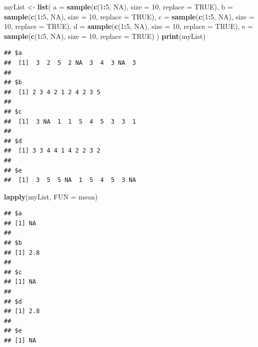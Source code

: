 \documentclass[
]{book}
\newenvironment{Shaded}{\begin{snugshade}}{\end{snugshade}}
\newcommand{\DataTypeTok}[1]{\textcolor[rgb]{0.13,0.29,0.53}{#1}}
\newcommand{\DecValTok}[1]{\textcolor[rgb]{0.00,0.00,0.81}{#1}}
\newcommand{\KeywordTok}[1]{\textcolor[rgb]{0.13,0.29,0.53}{\textbf{#1}}}
\newcommand{\NormalTok}[1]{#1}
\newcommand{\OperatorTok}[1]{\textcolor[rgb]{0.81,0.36,0.00}{\textbf{#1}}}
\newcommand{\OtherTok}[1]{\textcolor[rgb]{0.56,0.35,0.01}{#1}}
\newcommand{\StringTok}[1]{\textcolor[rgb]{0.31,0.60,0.02}{#1}}
\begin{document}
\begin{Shaded}
\begin{Highlighting}[]
\NormalTok{myList <-}\StringTok{ }\KeywordTok{list}\NormalTok{(}
  \DataTypeTok{a =} \KeywordTok{sample}\NormalTok{(}\KeywordTok{c}\NormalTok{(}\DecValTok{1}\OperatorTok{:}\DecValTok{5}\NormalTok{, }\OtherTok{NA}\NormalTok{), }\DataTypeTok{size =} \DecValTok{10}\NormalTok{, }\DataTypeTok{replace =} \OtherTok{TRUE}\NormalTok{), }
  \DataTypeTok{b =} \KeywordTok{sample}\NormalTok{(}\KeywordTok{c}\NormalTok{(}\DecValTok{1}\OperatorTok{:}\DecValTok{5}\NormalTok{, }\OtherTok{NA}\NormalTok{), }\DataTypeTok{size =} \DecValTok{10}\NormalTok{, }\DataTypeTok{replace =} \OtherTok{TRUE}\NormalTok{), }
  \DataTypeTok{c =} \KeywordTok{sample}\NormalTok{(}\KeywordTok{c}\NormalTok{(}\DecValTok{1}\OperatorTok{:}\DecValTok{5}\NormalTok{, }\OtherTok{NA}\NormalTok{), }\DataTypeTok{size =} \DecValTok{10}\NormalTok{, }\DataTypeTok{replace =} \OtherTok{TRUE}\NormalTok{), }
  \DataTypeTok{d =} \KeywordTok{sample}\NormalTok{(}\KeywordTok{c}\NormalTok{(}\DecValTok{1}\OperatorTok{:}\DecValTok{5}\NormalTok{, }\OtherTok{NA}\NormalTok{), }\DataTypeTok{size =} \DecValTok{10}\NormalTok{, }\DataTypeTok{replace =} \OtherTok{TRUE}\NormalTok{), }
  \DataTypeTok{e =} \KeywordTok{sample}\NormalTok{(}\KeywordTok{c}\NormalTok{(}\DecValTok{1}\OperatorTok{:}\DecValTok{5}\NormalTok{, }\OtherTok{NA}\NormalTok{), }\DataTypeTok{size =} \DecValTok{10}\NormalTok{, }\DataTypeTok{replace =} \OtherTok{TRUE}\NormalTok{)}
\NormalTok{)}
\KeywordTok{print}\NormalTok{(myList)}
\end{Highlighting}
\end{Shaded}

\begin{verbatim}
## $a
##  [1]  3  2  5  2 NA  3  4  3 NA  3
## 
## $b
##  [1] 2 3 4 2 1 2 4 2 3 5
## 
## $c
##  [1]  3 NA  1  1  5  4  5  3  3  1
## 
## $d
##  [1] 3 3 4 4 1 4 2 2 3 2
## 
## $e
##  [1]  3  5  5 NA  1  5  4  5  3 NA
\end{verbatim}

\begin{Shaded}
\begin{Highlighting}[]
\KeywordTok{lapply}\NormalTok{(myList, }\DataTypeTok{FUN =}\NormalTok{ mean)}
\end{Highlighting}
\end{Shaded}

\begin{verbatim}
## $a
## [1] NA
## 
## $b
## [1] 2.8
## 
## $c
## [1] NA
## 
## $d
## [1] 2.8
## 
## $e
## [1] NA
\end{verbatim}
\end{document}
